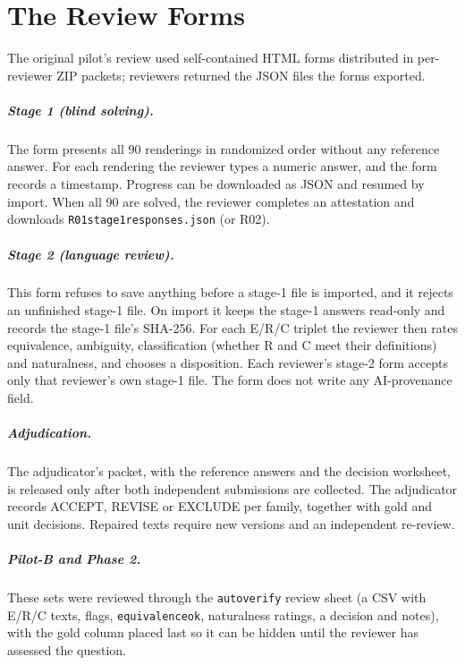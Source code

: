 \documentclass[12pt,a4paper,oneside]{report}
\renewcommand{\_}{\oldunderscore\allowbreak}
\begin{document}
\chapter{The Review Forms}
\label{app:forms}

The original pilot's review used self-contained HTML forms distributed in per-reviewer ZIP packets; reviewers returned the JSON files the forms exported.



\paragraph{Stage 1 (blind solving).} The form presents all 90 renderings in randomized order without any reference answer. For each rendering the reviewer types a numeric answer, and the form records a timestamp. Progress can be downloaded as JSON and resumed by import. When all 90 are solved, the reviewer completes an attestation and downloads \texttt{R01\_stage1\_responses.json} (or R02).

\paragraph{Stage 2 (language review).} This form refuses to save anything before a stage-1 file is imported, and it rejects an unfinished stage-1 file. On import it keeps the stage-1 answers read-only and records the stage-1 file's SHA-256. For each E/R/C triplet the reviewer then rates equivalence, ambiguity, classification (whether R and C meet their definitions) and naturalness, and chooses a disposition. Each reviewer's stage-2 form accepts only that reviewer's own stage-1 file. The form does not write any AI-provenance field.

\paragraph{Adjudication.} The adjudicator's packet, with the reference answers and the decision worksheet, is released only after both independent submissions are collected. The adjudicator records ACCEPT, REVISE or EXCLUDE per family, together with gold and unit decisions. Repaired texts require new versions and an independent re-review.

\paragraph{Pilot-B and Phase 2.} These sets were reviewed through the \texttt{autoverify} review sheet (a CSV with E/R/C texts, flags, \texttt{equivalence\_ok}, naturalness ratings, a decision and notes), with the gold column placed last so it can be hidden until the reviewer has assessed the question.
\end{document}
